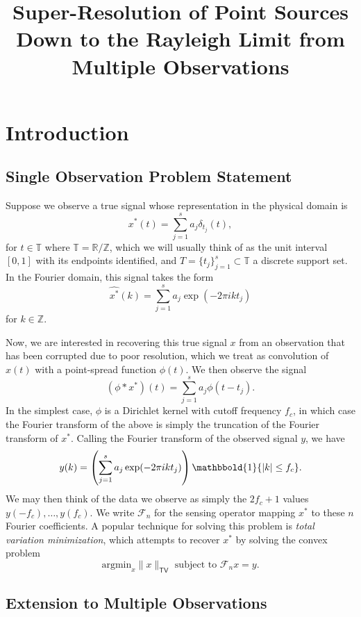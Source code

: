 \documentclass[11pt]{article}
\title{Super-Resolution of Point Sources Down to the Rayleigh Limit from Multiple Observations}
\newcommand{\RR}{\mathbb{R}}
\newcommand{\TT}{\mathbb{T}}
\newcommand{\ZZ}{\mathbb{Z}}
\newcommand{\One}{\mathbbold{1}}
\newcommand{\sF}{\mathcal{F}}
\newcommand{\argmin}{\mathrm{argmin}}
\begin{document}
\maketitle

\noindent

\section{Introduction}

\subsection{Single Observation Problem Statement}

Suppose we observe a true signal whose representation in the physical domain is
\[ x^*(t) = \sum_{j = 1}^s a_j \delta_{t_j}(t), \]
for $t \in \TT$ where $\TT = \RR / \ZZ$, which we will usually think of as the unit interval $[0, 1]$ with its endpoints identified, and $T = \{t_j\}_{j = 1}^s \subset \TT$ a discrete support set.
In the Fourier domain, this signal takes the form
\[ \widehat{x^*}(k) = \sum_{j = 1}^s a_j \exp(-2\pi i k t_j) \]
for $k \in \ZZ$.

Now, we are interested in recovering this true signal $x$ from an observation that has been corrupted due to poor resolution, which we treat as convolution of $x(t)$ with a point-spread function $\phi(t)$.
We then observe the signal
\[ (\phi * x^*)(t) = \sum_{j = 1}^sa_j \phi(t - t_j). \]
In the simplest case, $\phi$ is a Dirichlet kernel with cutoff frequency $f_c$, in which case the Fourier transform of the above is simply the truncation of the Fourier transform of $x^*$.
Calling the Fourier transform of the observed signal $y$, we have
\[ y(k) = \left(\sum_{j = 1}^s a_j \exp(-2\pi i k t_j)\right)\One\{|k| \leq f_c \}. \]
We may then think of the data we observe as simply the $2f_c + 1$ values $y(-f_c), \dots, y(f_c)$.
We write $\sF_n$ for the sensing operator mapping $x^*$ to these $n$ Fourier coefficients.
A popular technique for solving this problem is \emph{total variation minimization}, which attempts to recover $x^*$ by solving the convex problem
\[ \argmin_x \|x\|_{\mathsf{TV}} \text{ subject to } \sF_nx = y. \]

\subsection{Extension to Multiple Observations}
\end{document}
